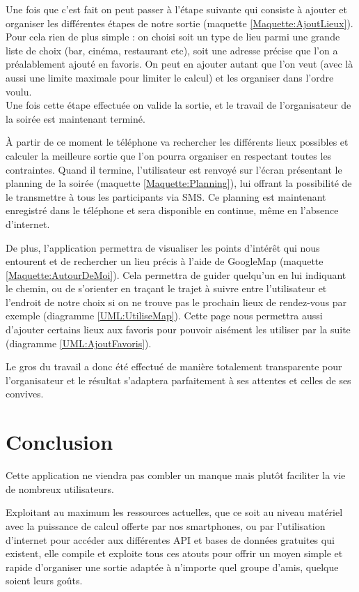 \documentclass[a4paper, 12pt, notitlepage]{article} %
\begin{document}
Une fois que c'est fait on peut passer à l'étape suivante qui consiste à ajouter et organiser les différentes étapes de notre sortie (maquette \ref{Maquette:AjoutLieux}).
Pour cela rien de plus simple : on choisi soit un type de lieu parmi une grande liste de choix (bar, cinéma, restaurant etc), soit une adresse précise que l'on a préalablement ajouté en favoris. On peut en ajouter autant que l'on veut (avec là aussi une limite maximale pour limiter le calcul) et les organiser dans l'ordre voulu.\\
Une fois cette étape effectuée on valide la sortie, et le travail de l'organisateur de la soirée est maintenant terminé.

À partir de ce moment le téléphone va rechercher les différents lieux possibles et calculer la meilleure sortie que l'on pourra organiser en respectant toutes les contraintes. Quand il termine, l'utilisateur est renvoyé sur l'écran présentant le planning de la soirée (maquette \ref{Maquette:Planning}), lui offrant la possibilité de le transmettre à tous les participants via SMS. Ce planning est maintenant enregistré dans le téléphone et sera disponible en continue, même en l'absence d'internet.

De plus, l'application permettra de visualiser les points d'intérêt qui nous entourent et de rechercher un lieu précis à l'aide de GoogleMap (maquette \ref{Maquette:AutourDeMoi}). Cela permettra de guider quelqu'un en lui indiquant le chemin, ou de s'orienter en traçant le trajet à suivre entre l'utilisateur et l'endroit de notre choix si on ne trouve pas le prochain lieux de rendez-vous par exemple (diagramme \ref{UML:UtiliseMap}). Cette page nous permettra aussi d'ajouter certains lieux aux favoris pour pouvoir aisément les utiliser par la suite (diagramme \ref{UML:AjoutFavoris}).

Le gros du travail a donc été effectué de manière totalement transparente pour l'organisateur et le résultat s'adaptera parfaitement à ses attentes et celles de ses convives.

\section{Conclusion}
Cette application ne viendra pas combler un manque mais plutôt faciliter la vie de nombreux utilisateurs.

Exploitant au maximum les ressources actuelles, que ce soit au niveau matériel avec la puissance de calcul offerte par nos smartphones, ou par l'utilisation d'internet pour accéder aux différentes API et bases de données gratuites qui existent, elle compile et exploite tous ces atouts pour offrir un moyen simple et rapide d'organiser une sortie adaptée à n'importe quel groupe d'amis, quelque soient leurs goûts.
\end{document}
